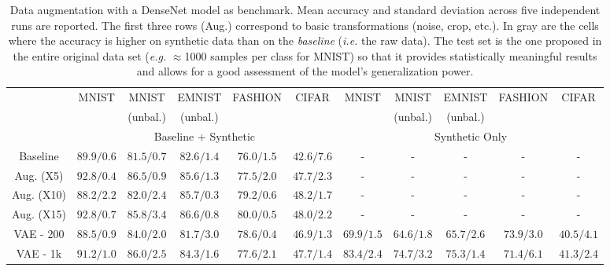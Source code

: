 \documentclass[10pt,journal,compsoc]{IEEEtran}
\begin{document}
\begin{table*}[!t]
  \caption{Data augmentation with a DenseNet model as benchmark. Mean accuracy and standard deviation across five independent runs are reported. The first three rows (Aug.) correspond to basic transformations (noise, crop, etc.). In gray are the cells where the accuracy is higher on synthetic data than on the \emph{baseline} (\textit{i.e.} the raw data). The test set is the one proposed in the entire original data set (\textit{e.g.} $\approx$1000 samples per class for MNIST) so that it provides statistically meaningful results and allows for a good assessment of the model's generalization power.}
  \label{Tab: Data Augmentation Toys}
 \centering
 \scriptsize
   \begin{tabular}{c|ccccc|ccccc}

   \cline{2-11}
    & \multirow{2}{*}{MNIST}& MNIST &EMNIST &  \multirow{2}{*}{FASHION} & \multirow{2}{*}{CIFAR} & \multirow{2}{*}{MNIST}& MNIST &EMNIST &  \multirow{2}{*}{FASHION} & \multirow{2}{*}{CIFAR} \\
                  &   &(unbal.)& (unbal.)& & & &(unbal.)& (unbal.)& \\
    \hline
    &\multicolumn{5}{c|}{Baseline + Synthetic} & \multicolumn{5}{c}{Synthetic Only}\\
     \hline
     Baseline  & $89.9/0.6$ & $81.5/0.7$ & $82.6/1.4$ & $76.0/1.5$ & $42.6/7.6$ & - & - & - & - & - \\
     \hline
     Aug. (X5) & $92.8/0.4$ & $86.5 /0.9$ & $85.6 /1.3$ & $77.5 /2.0$ & $47.7 /2.3$ & - & - & - & - & -\\
     Aug. (X10)& $88.2 /2.2$ & $82.0 /2.4$ & $85.7 /0.3$ & $79.2 /0.6$ & $48.2 /1.7 $ & - & - & - & - & -\\
     Aug. (X15)& $92.8 /0.7$ & $85.8 /3.4$ & $86.6 /0.8$ & $80.0 /0.5$ & $48.0 /2.2 $ & - & - & - & - & -\\
     \hline
     VAE - 200 & $88.5 /0.9$ & $84.0 /2.0$ & $81.7 /3.0$ & $78.6 /0.4$ & 
     $ 46.9 /1.3$
     &$69.9 /1.5$ & $64.6 /1.8$ & $65.7 /2.6$ & $73.9 /3.0$ & $40.5 /4.1$ \\
     VAE - 1k  & $91.2 /1.0$ & $86.0 /2.5$ & $84.3 /1.6$ & $77.6 /2.1$ & 
     $47.7 /1.4$
     &$83.4 /2.4$ & $74.7 /3.2$ & $75.3 /1.4$ & $71.4 /6.1$ & $41.3 /2.4$\\

\end{tabular}
\end{table*}
\end{document}
